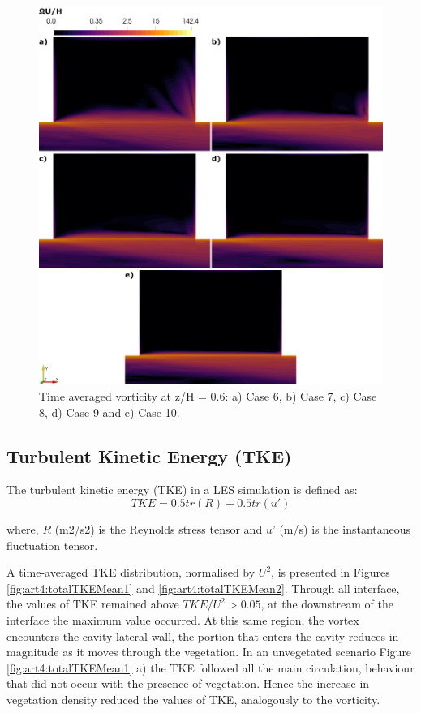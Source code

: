 \begin{figure}[!ht]
\centering
\includegraphics[width=\linewidth]{../images/art4/vorticityMean2.jpeg}
\caption{Time averaged vorticity at z/H = 0.6: a) Case 6, b) Case 7, c) Case 8, d) Case 9 and e) Case 10.}
\label{fig:art4:vorticityMean2}
\end{figure}

\subsection{Turbulent Kinetic Energy (TKE)}
The turbulent kinetic energy (TKE) in a LES simulation is defined as:
\begin{equation}
TKE = 0.5 tr(R) + 0.5 tr(u')
\label{eqn:art4:tke}
\end{equation}

where, $R$ (m2/s2) is the Reynolds stress tensor and $u’$ (m/s) is the instantaneous fluctuation tensor.

A time-averaged TKE distribution, normalised by $U^2$, is presented in Figures \ref{fig:art4:totalTKEMean1} and \ref{fig:art4:totalTKEMean2}. Through all interface, the values of TKE remained above $TKE/U^2 > 0.05$, at the downstream of the interface the maximum value occurred. At this same region, the vortex encounters the cavity lateral wall, the portion that enters the cavity reduces in magnitude as it moves through the vegetation. In an unvegetated scenario Figure \ref{fig:art4:totalTKEMean1} a) the TKE followed all the main circulation, behaviour that did not occur with the presence of vegetation. Hence the increase in vegetation density reduced the values of TKE, analogously to the vorticity.

